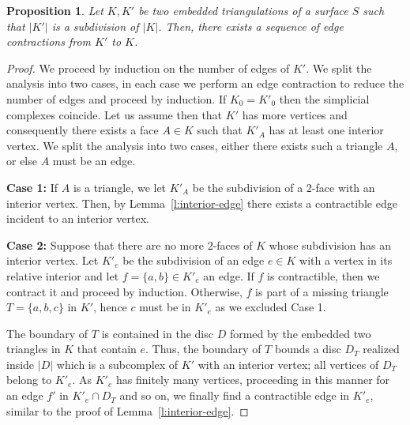 \documentclass[reqno,english]{amsart}
\newtheorem{proposition}[theorem]{Proposition}
\numberwithin{claimcounter}{theorem}
\theoremstyle{remark}
\theoremstyle{definition}
\numberwithin{theorem}{section}
\begin{document}
\begin{proposition}
  \label{p:minor}
  Let $K,K'$ be two embedded triangulations of a surface $S$ such that $|K'|$ is a subdivision of $|K|$.
  Then, there exists a sequence of edge contractions from $K'$ to $K$.
\end{proposition}
\begin{proof}
   We proceed by induction on the number of edges of $K'$.
   We split the analysis into two cases, in each case we perform an edge contraction to reduce the number of edges and proceed by induction.
   If $K_0=K'_0$ then the simplicial complexes coincide. Let us assume then that $K'$ has more vertices and consequently there exists a face $A\in K$ such that $K'_A$ has at least one interior vertex. We split the analysis into two cases, either there exists such a triangle $A$, or else $A$ must be an edge.
   
   \noindent
   {\bf Case 1:} If $A$ is a triangle, we let $K'_A$ be the subdivision of a $2$-face with an interior vertex. Then, by Lemma~\ref{l:interior-edge} there exists a contractible edge incident to an interior vertex.
   
   \noindent
   {\bf Case 2:}  Suppose
    that there are no more $2$-faces of $K$ whose subdivision has an interior vertex. Let $K'_e$ be the subdivision of an edge $e\in K$ with a vertex in its relative interior and let $f=\{a,b\}\in K'_e$ an edge. If $f$ is contractible, then we contract it and proceed by induction. Otherwise, $f$ is part of a missing triangle $T=\{a,b,c\}$ in $K'$, hence $c$ must be in $K'_e$ as we excluded Case 1.

   The boundary of $T$ is contained in the disc $D$ formed by the embedded two triangles in $K$ that contain $e$. Thus, the boundary of $T$ bounds a disc $D_T$ realized inside $|D|$ which is a subcomplex of $K'$ with an interior vertex; all vertices of $D_T$ belong to $K'_e$.
   As $K'_e$ has finitely many vertices, proceeding in this manner for an edge $f'$ in $K'_e\cap D_T$ and so on, we finally find a contractible edge in $K'_e$,
similar to the proof of Lemma~\ref{l:interior-edge}.
\end{proof}
\end{document}
